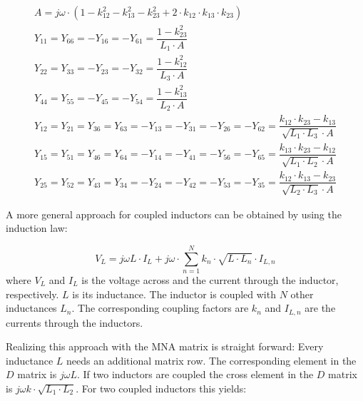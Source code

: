 \begin{gather}
A = j\omega\cdot (1 - k_{12}^2 - k_{13}^2 - k_{23}^2 + 2\cdot k_{12}\cdot k_{13}\cdot k_{23} ) \\
Y_{11} = Y_{66} = -Y_{16} = -Y_{61} = \dfrac{1-k_{23}^2}{L_1\cdot A} \\
Y_{22} = Y_{33} = -Y_{23} = -Y_{32} = \dfrac{1-k_{12}^2}{L_3\cdot A} \\
Y_{44} = Y_{55} = -Y_{45} = -Y_{54} = \dfrac{1-k_{13}^2}{L_2\cdot A} \\
Y_{12} = Y_{21} = Y_{36} = Y_{63} = -Y_{13} = -Y_{31} = -Y_{26} = -Y_{62}
   = \dfrac{k_{12}\cdot k_{23} - k_{13}}{\sqrt{L_1\cdot L_3}\cdot A} \\
Y_{15} = Y_{51} = Y_{46} = Y_{64} = -Y_{14} = -Y_{41} = -Y_{56} = -Y_{65}
   = \dfrac{k_{13}\cdot k_{23} - k_{12}}{\sqrt{L_1\cdot L_2}\cdot A} \\
Y_{25} = Y_{52} = Y_{43} = Y_{34} = -Y_{24} = -Y_{42} = -Y_{53} = -Y_{35}
   = \dfrac{k_{12}\cdot k_{13} - k_{23}}{\sqrt{L_2\cdot L_3}\cdot A}
\end{gather}

A more general approach for coupled inductors can be obtained by
using the induction law:

\begin{equation}
V_L = j\omega L\cdot I_L + j\omega\cdot \sum_{n=1}^N k_n\cdot\sqrt{L\cdot L_n}\cdot I_{L,n}
\end{equation}
where $V_L$ and $I_L$ is the voltage across and the current through
the inductor, respectively.  $L$ is its inductance.  The inductor is
coupled with $N$ other inductances $L_n$.  The corresponding coupling
factors are $k_n$ and $I_{L,n}$ are the currents through the inductors.

\addvspace{12pt}

Realizing this approach with the MNA matrix is straight forward: Every
inductance $L$ needs an additional matrix row.  The corresponding
element in the $D$ matrix is $j\omega L$.  If two inductors are
coupled the cross element in the $D$ matrix is $j\omega
k\cdot\sqrt{L_1\cdot L_2}$.  For two coupled inductors this yields:


